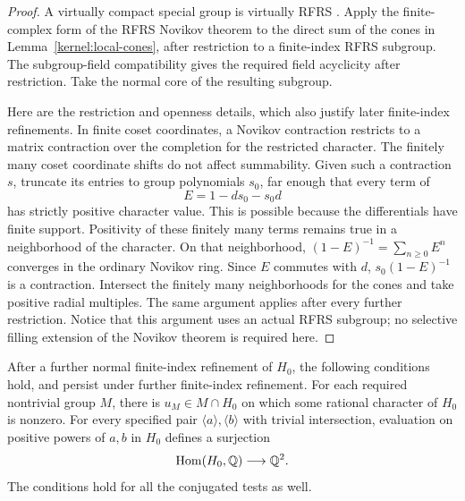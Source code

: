 \begin{proof}
A virtually compact special group is virtually RFRS
\cite{HaglundWise2008,Agol2008}.  Apply the finite-complex form of the
RFRS Novikov theorem \cite[Theorem~5.2]{Kielak2020} to the direct sum of
the cones in Lemma~\ref{kernel:local-cones}, after restriction to a
finite-index RFRS subgroup.  The subgroup-field compatibility gives the
required field acyclicity after restriction.  Take the normal core of
the resulting subgroup.

Here are the restriction and openness details, which also justify
later finite-index refinements.  In finite coset coordinates, a
Novikov contraction restricts to a matrix contraction over the
completion for the restricted character.  The finitely many coset
coordinate shifts do not affect summability.  Given such a contraction
\(s\), truncate its entries to group polynomials \(s_0\), far enough
that every term of
\[
                            E=1-ds_0-s_0d
\]
has strictly positive character value.  This is possible because the
differentials have finite support.  Positivity of these finitely many
terms remains true in a neighborhood of the character.  On that
neighborhood, \((1-E)^{-1}=\sum_{n\ge0}E^n\) converges in the ordinary
Novikov ring.  Since \(E\) commutes with \(d\),
\(s_0(1-E)^{-1}\) is a contraction.  Intersect the finitely many
neighborhoods for the cones and take positive radial multiples.
The same argument applies after every further restriction.  Notice
that this argument uses an actual RFRS subgroup; no selective filling
extension of the Novikov theorem is required here.
\end{proof}

\begin{lemma}\label{kernel:visibility}
After a further normal finite-index refinement of \(H_0\), the following
conditions hold, and persist under further finite-index refinement.
For each required nontrivial group \(M\), there is \(u_M\in M\cap H_0\)
on which some rational character of \(H_0\) is nonzero.  For every
specified pair \(\langle a\rangle,\langle b\rangle\) with trivial
intersection, evaluation on positive powers of \(a,b\) in \(H_0\)
defines a surjection
\[
             \operatorname{Hom}(H_0,\mathbb Q)\longrightarrow\mathbb Q^2.
\]
The conditions hold for all the conjugated tests as well.
\end{lemma}

